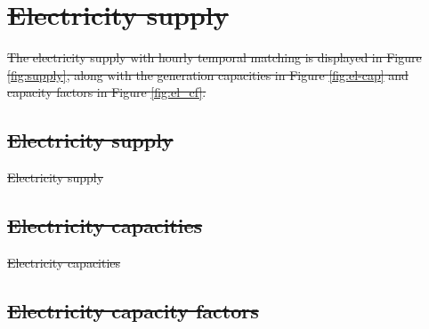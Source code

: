 \documentclass[5p,numafflabel]{elsarticle}
\providecommand{\DIFdeltex}[1]{{\protect\color{red}\sout{#1}}}                      %
\providecommand{\DIFdelFL}[1]{\DIFdel{#1}} %
\providecommand{\DIFdel}[1]{\texorpdfstring{\DIFdeltex{#1}}{}} %
\begin{document}


\section{\DIFdel{Electricity supply}}
\addtocounter{section}{-1}%

\DIFdel{The electricity supply with hourly temporal matching is displayed in Figure \ref{fig:supply}, along with the generation capacities
in Figure \ref{fig:el-cap} and capacity factors in Figure  \ref{fig:el_cf}.
}%

\subsection{\DIFdel{Electricity supply}}
\addtocounter{subsection}{-1}%

{%
\DIFdelFL{Electricity supply}}

\subsection{\DIFdel{Electricity capacities}}
\addtocounter{subsection}{-1}%

{%
\DIFdelFL{Electricity capacities}}

\subsection{\DIFdel{Electricity capacity factors}}
\addtocounter{subsection}{-1}%
\end{document}

